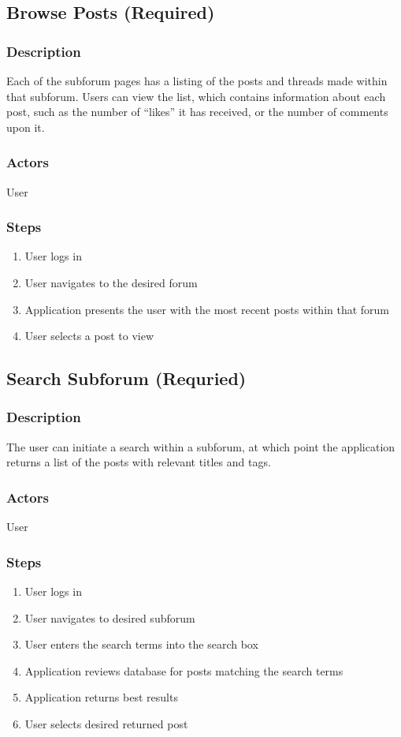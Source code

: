 \documentclass[12pt]{scrartcl}
\begin{document}
\subsection{Browse Posts (Required)}
\subsubsection{Description}
Each of the subforum pages has a listing of the posts and threads made within that subforum. Users can view the list, which contains
information about each post, such as the number of “likes” it has received, or the number of comments upon it.

\subsubsection {Actors}
User

\subsubsection{Steps}
\begin {enumerate}
\item User logs in
\item User navigates to the desired forum
\item Application presents the user with the most recent posts within that forum
\item User selects a post to view
\end{enumerate}

\subsection{Search Subforum (Requried)}
\subsubsection{Description}
The user can initiate a search within a subforum, at which point the application returns a list of the posts with relevant titles and tags.

\subsubsection{Actors}
User

\subsubsection{Steps}
\begin{enumerate}
\item User logs in
\item User navigates to desired subforum
\item User enters the search terms into the search box
\item Application reviews database for posts matching the search terms
\item Application returns best results
\item User selects desired returned post
\end {enumerate}
\end{document}
